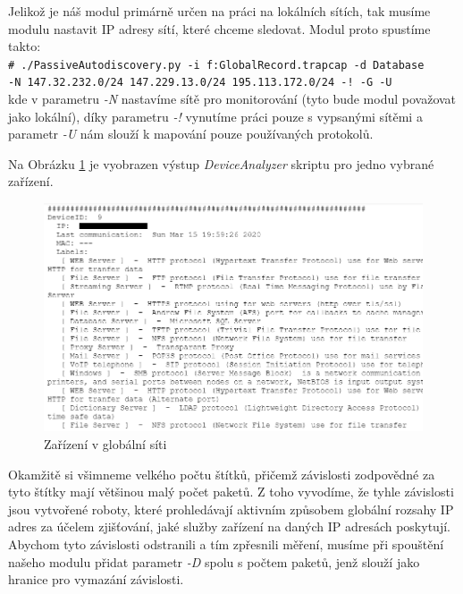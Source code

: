\documentclass[thesis=B,czech,hidelinks]{FITthesis}[2019/03/21]
\newcommand{\shellcmd}[1]{\\\indent\indent\texttt{\footnotesize\# #1}\\}
\begin{document}
    Jelikož je náš modul primárně určen na práci na lokálních sítích, tak musíme modulu nastavit IP adresy sítí, které chceme sledovat. Modul proto spustíme takto:
    \shellcmd{./PassiveAutodiscovery.py -i f:GlobalRecord.trapcap -d Database \\ -N 147.32.232.0/24  147.229.13.0/24 195.113.172.0/24 -! -G -U }
     kde v parametru \emph{-N} nastavíme sítě pro monitorování (tyto bude modul považovat jako lokální), díky parametru \emph{-!} vynutíme práci pouze s vypsanými sítěmi a parametr \emph{-U} nám slouží k mapování pouze  používaných protokolů. 
    
    Na Obrázku \ref{Global1} je vyobrazen výstup \emph{DeviceAnalyzer} skriptu pro jedno vybrané zařízení.  
    \begin{figure}[h!]
        \centering
        \includegraphics[width=\textwidth]{Global_nondelete}
        \caption[Ukázka měření: Globální síť]{Zařízení v globální síti}
        \label{Global1}
    \end{figure}
    
    Okamžitě si všimneme velkého počtu štítků, přičemž závislosti zodpovědné za tyto štítky mají většinou malý počet paketů. Z toho vyvodíme, že tyhle závislosti jsou vytvořené roboty, které prohledávají aktivním způsobem globální rozsahy IP adres za účelem zjišťování, jaké služby zařízení na daných IP adresách poskytují. Abychom tyto závislosti odstranili a tím zpřesnili měření, musíme při spouštění našeho modulu přidat parametr \emph{-D} spolu s počtem paketů, jenž slouží jako hranice pro vymazání závislosti. 
    
\end{document}
